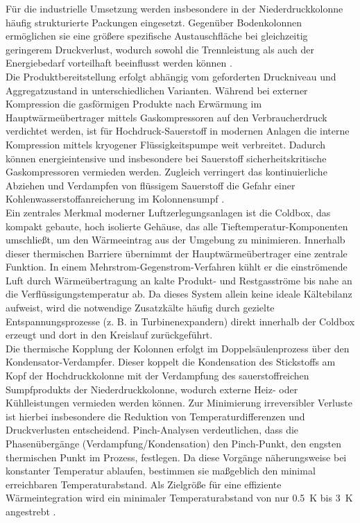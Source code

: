 Für die industrielle Umsetzung werden insbesondere in der Niederdruckkolonne häufig strukturierte Packungen eingesetzt. Gegenüber Bodenkolonnen ermöglichen sie eine größere spezifische Austauschfläche bei gleichzeitig geringerem Druckverlust, wodurch sowohl die Trennleistung als auch der Energiebedarf vorteilhaft beeinflusst werden können \cite{heinz-wolfgangharingAirGasesNitrogen2007}.\\
Die Produktbereitstellung erfolgt abhängig vom geforderten Druckniveau und Aggregatzustand in unterschiedlichen Varianten. Während bei externer Kompression die gasförmigen Produkte nach Erwärmung im Hauptwärmeübertrager mittels Gaskompressoren auf den Verbraucherdruck verdichtet werden, ist für Hochdruck-Sauerstoff in modernen Anlagen die interne Kompression mittels kryogener Flüssigkeitspumpe weit verbreitet. Dadurch können energieintensive und insbesondere bei Sauerstoff sicherheitskritische Gaskompressoren vermieden werden. Zugleich verringert das kontinuierliche Abziehen und Verdampfen von flüssigem Sauerstoff die Gefahr einer Kohlenwasserstoffanreicherung im Kolonnensumpf \cite{teschComparativeEvaluationCryogenic2020, heinz-wolfgangharingAirGasesNitrogen2007}. \\
Ein zentrales Merkmal moderner Luftzerlegungsanlagen ist die Coldbox, das kompakt gebaute, hoch isolierte Gehäuse, das alle Tieftemperatur-Komponenten umschließt, um den Wärmeeintrag aus der Umgebung zu minimieren. Innerhalb dieser thermischen Barriere übernimmt der Hauptwärmeübertrager eine zentrale Funktion. In einem Mehrstrom-Gegenstrom-Verfahren kühlt er die einströmende Luft durch Wärmeübertragung an kalte Produkt- und Restgasströme bis nahe an die Verflüssigungstemperatur ab. Da dieses System allein keine ideale Kältebilanz aufweist, wird die notwendige Zusatzkälte häufig durch gezielte Entspannungsprozesse (z. B. in Turbinenexpandern) direkt innerhalb der Coldbox erzeugt und dort in den Kreislauf zurückgeführt. \cite{teschExergybasedMethodsApplied, hamayunEvaluationTwoColumnAir2020} \\
Die thermische Kopplung der Kolonnen erfolgt im Doppelsäulenprozess über den Kondensator-Verdampfer. Dieser koppelt die Kondensation des Stickstoffs am Kopf der Hochdruckkolonne
mit der Verdampfung des sauerstoffreichen Sumpfprodukts der Niederdruckkolonne, wodurch externe Heiz- oder Kühlleistungen vermieden werden können. Zur Minimierung irreversibler Verluste ist hierbei insbesondere die Reduktion von Temperaturdifferenzen und Druckverlusten entscheidend. Pinch-Analysen verdeutlichen, dass die Phasenübergänge (Verdampfung/Kondensation) den Pinch-Punkt, den engsten thermischen Punkt im Prozess, festlegen. Da diese Vorgänge näherungsweise bei konstanter Temperatur ablaufen, bestimmen sie maßgeblich den minimal erreichbaren Temperaturabstand. Als Zielgröße für eine effiziente Wärmeintegration wird ein minimaler Temperaturabstand von nur \SI{0,5}{\kelvin} bis \SI{3}{\kelvin} angestrebt \cite{yanEnergySavingOpportunities2010, hamayunEvaluationTwoColumnAir2020}.\\
